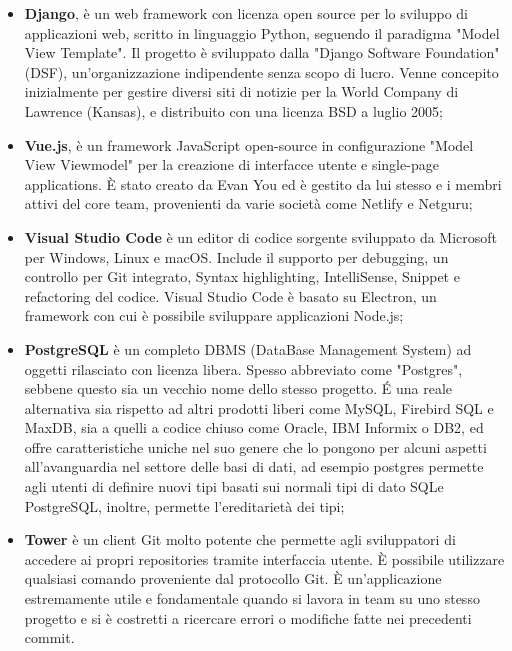 \documentclass[12pt,a4paper]{article}
\begin{document}
\begin{itemize}
    \item \textbf{Django}, è un web framework con licenza open source per lo sviluppo di applicazioni web, scritto in linguaggio Python, seguendo il paradigma "Model View Template". Il progetto è sviluppato dalla "Django Software Foundation" (DSF), un'organizzazione indipendente senza scopo di lucro. Venne concepito inizialmente per gestire diversi siti di notizie per la World Company di Lawrence (Kansas), e distribuito con una licenza BSD a luglio 2005;

    \item \textbf{Vue.js}, è un framework JavaScript open-source in configurazione "Model View Viewmodel" per la creazione di interfacce utente e single-page applications. È stato creato da Evan You ed è gestito da lui stesso e i membri attivi del core team, provenienti da varie società come Netlify e Netguru;

    \item \textbf{Visual Studio Code} è un editor di codice sorgente sviluppato da Microsoft per Windows, Linux e macOS. Include il supporto per debugging, un controllo per Git integrato, Syntax highlighting, IntelliSense, Snippet e refactoring del codice. Visual Studio Code è basato su Electron, un framework con cui è possibile sviluppare applicazioni Node.js;

    \item\textbf{PostgreSQL} è un completo DBMS (DataBase Management System) ad oggetti rilasciato con licenza libera. Spesso abbreviato come "Postgres", sebbene questo sia un vecchio nome dello stesso progetto. É una reale alternativa sia rispetto ad altri prodotti liberi come MySQL, Firebird SQL e MaxDB, sia a quelli a codice chiuso come Oracle, IBM Informix o DB2, ed offre caratteristiche uniche nel suo genere che lo pongono per alcuni aspetti all'avanguardia nel settore delle basi di dati, ad esempio postgres permette agli utenti di definire nuovi tipi basati sui normali tipi di dato SQLe PostgreSQL, inoltre, permette l'ereditarietà dei tipi;

    \item \textbf{Tower} è un client Git molto potente che permette agli sviluppatori di accedere ai propri repositories tramite interfaccia utente. È possibile utilizzare qualsiasi comando proveniente dal protocollo Git. È un’applicazione estremamente utile e fondamentale quando si lavora in team su uno stesso progetto e si è costretti a ricercare errori o modifiche fatte nei precedenti commit.
\end{itemize}
\clearpage
\end{document}
